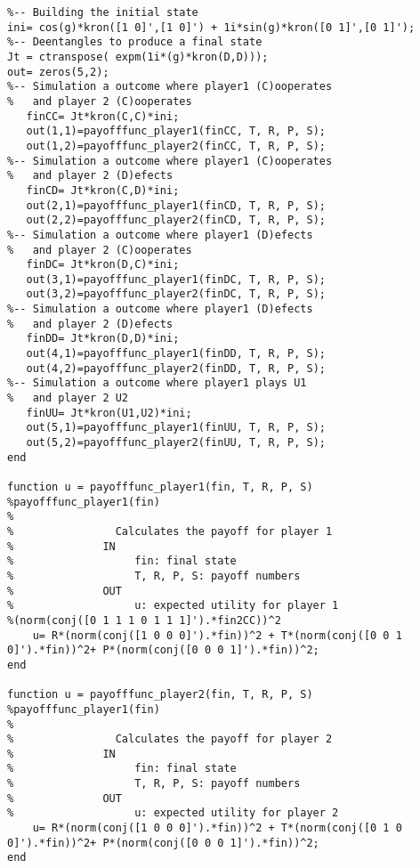 \begin{lstlisting}
%-- Building the initial state
ini= cos(g)*kron([1 0]',[1 0]') + 1i*sin(g)*kron([0 1]',[0 1]');
%-- Deentangles to produce a final state
Jt = ctranspose( expm(1i*(g)*kron(D,D)));
out= zeros(5,2);   
%-- Simulation a outcome where player1 (C)ooperates 
%   and player 2 (C)ooperates
   finCC= Jt*kron(C,C)*ini;
   out(1,1)=payofffunc_player1(finCC, T, R, P, S);
   out(1,2)=payofffunc_player2(finCC, T, R, P, S);
%-- Simulation a outcome where player1 (C)ooperates 
%   and player 2 (D)efects
   finCD= Jt*kron(C,D)*ini;
   out(2,1)=payofffunc_player1(finCD, T, R, P, S);
   out(2,2)=payofffunc_player2(finCD, T, R, P, S);
%-- Simulation a outcome where player1 (D)efects
%   and player 2 (C)ooperates
   finDC= Jt*kron(D,C)*ini;
   out(3,1)=payofffunc_player1(finDC, T, R, P, S);
   out(3,2)=payofffunc_player2(finDC, T, R, P, S);
%-- Simulation a outcome where player1 (D)efects
%   and player 2 (D)efects
   finDD= Jt*kron(D,D)*ini;
   out(4,1)=payofffunc_player1(finDD, T, R, P, S);
   out(4,2)=payofffunc_player2(finDD, T, R, P, S);
%-- Simulation a outcome where player1 plays U1
%   and player 2 U2
   finUU= Jt*kron(U1,U2)*ini;
   out(5,1)=payofffunc_player1(finUU, T, R, P, S);
   out(5,2)=payofffunc_player2(finUU, T, R, P, S);
end

function u = payofffunc_player1(fin, T, R, P, S)
%payofffunc_player1(fin)
%   
%                Calculates the payoff for player 1
%              IN
%                   fin: final state
%                   T, R, P, S: payoff numbers
%              OUT
%                   u: expected utility for player 1
%(norm(conj([0 1 1 1 0 1 1 1]').*fin2CC))^2
    u= R*(norm(conj([1 0 0 0]').*fin))^2 + T*(norm(conj([0 0 1 0]').*fin))^2+ P*(norm(conj([0 0 0 1]').*fin))^2;
end

function u = payofffunc_player2(fin, T, R, P, S)
%payofffunc_player1(fin)
%   
%                Calculates the payoff for player 2
%              IN
%                   fin: final state
%                   T, R, P, S: payoff numbers
%              OUT
%                   u: expected utility for player 2
    u= R*(norm(conj([1 0 0 0]').*fin))^2 + T*(norm(conj([0 1 0 0]').*fin))^2+ P*(norm(conj([0 0 0 1]').*fin))^2;
end



\end{lstlisting}
